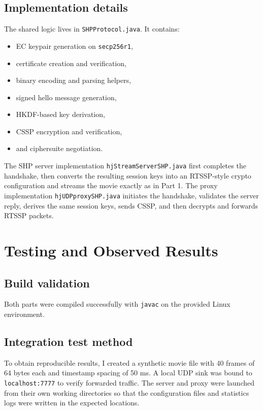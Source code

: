 \documentclass[11pt,a4paper]{article}
\begin{document}
\subsection{Implementation details}
The shared logic lives in \texttt{SHPProtocol.java}. It contains:
\begin{itemize}[leftmargin=1.2em]
  \item EC keypair generation on \texttt{secp256r1},
  \item certificate creation and verification,
  \item binary encoding and parsing helpers,
  \item signed hello message generation,
  \item HKDF-based key derivation,
  \item CSSP encryption and verification,
  \item and ciphersuite negotiation.
\end{itemize}

The SHP server implementation \texttt{hjStreamServerSHP.java} first completes the handshake, then converts the resulting session keys into an RTSSP-style crypto configuration and streams the movie exactly as in Part 1. The proxy implementation \texttt{hjUDPproxySHP.java} initiates the handshake, validates the server reply, derives the same session keys, sends CSSP, and then decrypts and forwards RTSSP packets.

\section{Testing and Observed Results}
\subsection{Build validation}
Both parts were compiled successfully with \texttt{javac} on the provided Linux environment.

\subsection{Integration test method}
To obtain reproducible results, I created a synthetic movie file with 40 frames of 64 bytes each and timestamp spacing of 50 ms. A local UDP sink was bound to \texttt{localhost:7777} to verify forwarded traffic. The server and proxy were launched from their own working directories so that the configuration files and statistics logs were written in the expected locations.
\end{document}

